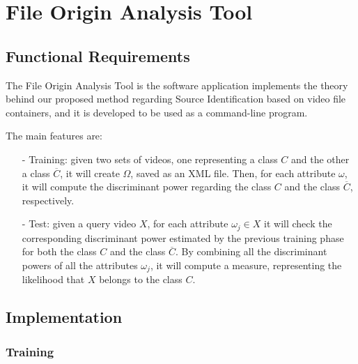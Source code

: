 \section{File Origin Analysis Tool}

\subsection{Functional Requirements}

The File Origin Analysis Tool is the software application implements the theory behind our proposed method regarding Source Identification based on video file containers, and it is developed to be used as a command-line program.

The main features are:
\begin{itemize}

\item[-] Training: given two sets of videos, one representing a class $C$ and the other a class $\overline{C}$, it will create $\Omega$, saved as an XML file. Then, for each attribute $\omega$, it will compute the discriminant power regarding the class $C$ and the class $\overline{C}$, respectively.

\item[-] Test: given a query video $X$, for each attribute $\omega_{j} \in X$ it will check the corresponding discriminant power estimated by the previous training phase for both the class $C$ and the class $\overline{C}$. By combining all the discriminant powers of all the attributes $\omega_{j}$, it will compute a measure, representing the likelihood that $X$ belongs to the class $C$.

\end{itemize}

\subsection{Implementation}

\subsubsection{Training}

